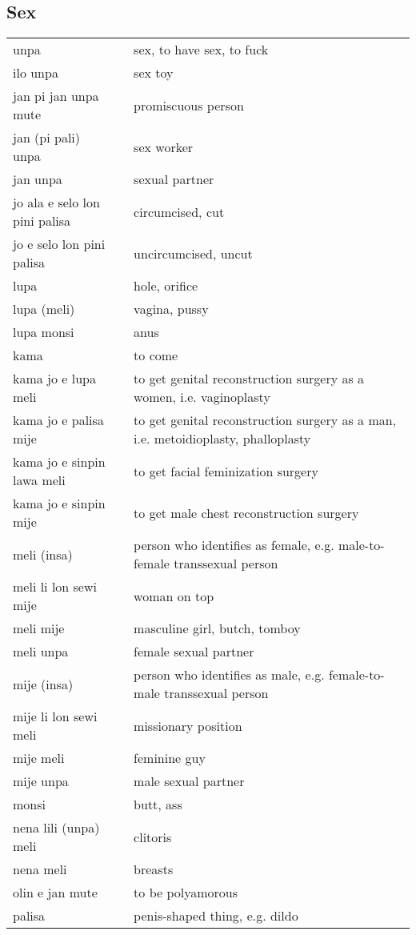 \subsection{Sex}
%
\begin{supertabular}{p{4,5cm}|ll}
unpa && sex, to have sex, to fuck \\
ilo unpa && sex toy \\
jan pi jan unpa mute && promiscuous person \\
jan (pi pali) unpa && sex worker \\
jan unpa && sexual partner \\
jo ala e selo lon pini palisa && circumcised, cut \\
jo e selo lon pini palisa && uncircumcised, uncut \\
lupa && hole, orifice \\
lupa (meli) && vagina, pussy \\
lupa monsi && anus \\
kama && to come \\
kama jo e lupa meli && to get genital reconstruction surgery as a women, i.e. vaginoplasty \\ 
kama jo e palisa mije && to get genital reconstruction surgery as a man, i.e. metoidioplasty, phalloplasty \\
kama jo e sinpin lawa meli && to get facial feminization surgery \\
kama jo e sinpin mije && to get male chest reconstruction surgery \\
meli (insa) && person who identifies as female, e.g. male-to-female transsexual person \\
meli li lon sewi mije && woman on top \\
meli mije && masculine girl, butch, tomboy \\
meli unpa && female sexual partner \\
mije (insa) && person who identifies as male, e.g. female-to-male transsexual person \\
mije li lon sewi meli && missionary position \\
mije meli && feminine guy \\
mije unpa && male sexual partner \\
monsi && butt, ass \\
nena lili (unpa) meli && clitoris \\
nena meli && breasts \\
olin e jan mute && to be polyamorous \\
palisa && penis-shaped thing, e.g. dildo \\

\end{supertabular}

